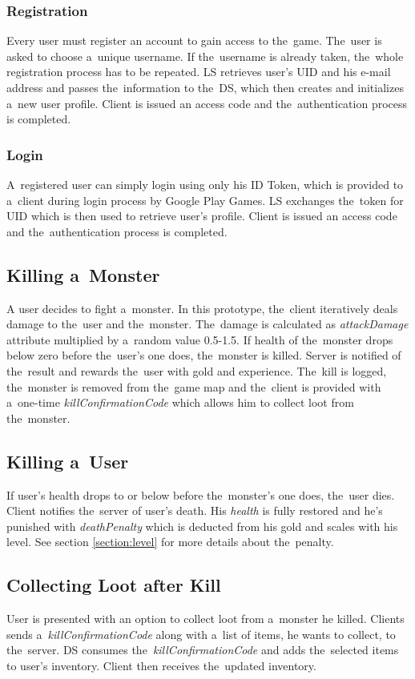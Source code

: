 		\subsubsection*{Registration}
		Every user must register an account to gain access to the~game. The~user is asked to choose a~unique username. If the~username is already taken, the~whole registration process has to be repeated. LS retrieves user's UID and his e-mail address and passes the~information to the~DS, which then creates and initializes a~new user profile. Client is issued an access code and the~authentication process is completed.
		
		\subsubsection*{Login}
		A~registered user can simply login using only his ID Token, which is provided to a~client during login process by Google Play Games. LS exchanges the~token for UID which is then used to retrieve user's profile. Client is issued an access code and the~authentication process is completed.
	
	\subsection{Killing a~Monster}
	A user decides to fight a~monster. In this prototype, the~client iteratively deals damage to the~user and the~monster. The~damage is calculated as \textit{attackDamage} attribute multiplied by a~random value 0.5-1.5. If health of the~monster drops below zero before the~user's one does, the~monster is killed. Server is notified of the~result and rewards the~user with gold and experience. The~kill is logged, the~monster is removed from the~game map and the~client is provided with a~one-time \textit{killConfirmationCode} which allows him to collect loot from the~monster.
		
	\subsection{Killing a~User}
	If user's health drops to or below before the~monster's one does, the~user dies. Client notifies the~server of user's death. His \textit{health} is fully restored and he's punished with \textit{deathPenalty} which is deducted from his gold and scales with his level. See section \ref{section:level} for more details about the~penalty.
	
	\subsection{Collecting Loot after Kill}
	User is presented with an option to collect loot from a~monster he killed. Clients sends a~\textit{killConfirmationCode} along with a~list of items, he wants to collect, to the~server. DS consumes the~\textit{killConfirmationCode} and adds the~selected items to user's inventory. Client then receives the~updated inventory.
	
